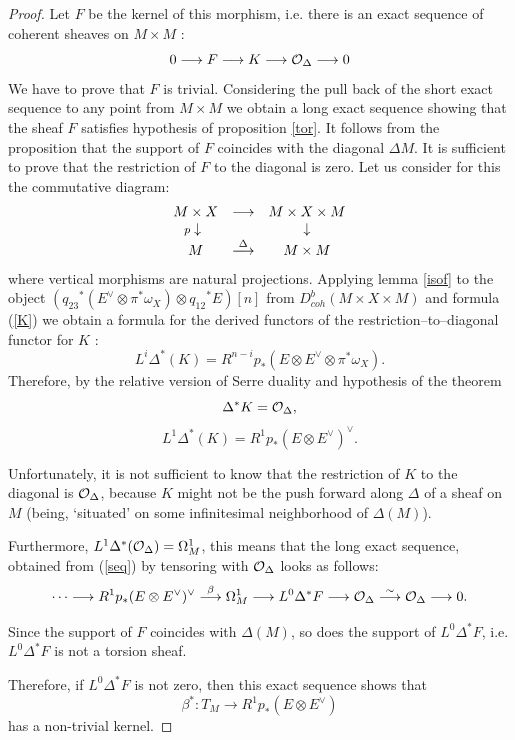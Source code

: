 \documentclass[12pt]{article}
\def\db#1{ D^b_{coh}({#1})}
\def\lto{\longrightarrow}
\def\o#1{{\cal O}_{#1}}
\begin{document}
\begin{proof}
Let $F$ be the kernel of this morphism, i.e. there is an exact sequence of coherent sheaves on $M\times M$ :
\begin{equation}\label{seq}
0\lto F \lto K\lto {\o\Delta}\lto 0
\end{equation}
We have to prove that $F$ is trivial. Considering the pull back of the short exact sequence to any point from $M\times M$ we obtain a long exact sequence showing that the sheaf $F$ satisfies hypothesis of proposition \ref{tor}. It follows from the proposition that the support of $F$ coincides with the diagonal $\Delta M$. It is sufficient to prove that the restriction of $F$ to the diagonal is zero. Let us consider for this the commutative diagram:
$$
\begin{array}{ccc}
M\times X&{\longrightarrow}& M\times X\times M\\
\llap{\footnotesize $p$} \downarrow && \downarrow\\
M&\stackrel{\Delta}{\longrightarrow}& M\times M 
\end{array}
$$
where vertical morphisms are natural projections. Applying lemma \ref{isof} to the object $({q_{23}}^*(E^{\vee}\otimes \pi^*\omega_X)\otimes {q_{12}}^*E)[n]$ from $\db{M\times X\times M}$ and formula (\ref{K}) we obtain a formula for the  derived functors of the restriction--to--diagonal functor for $K$ :
$$
L^i\Delta^*(K)=R^{n-i} p_*(E\otimes E^{\vee}\otimes \pi^*\omega_X).
$$
Therefore, by the relative version of Serre duality and hypothesis of the theorem
$$
\Delta^*K={\o \Delta},
$$
$$
L^1 \Delta^*(K)=R^1p_*(E\otimes E^{\vee})^{\vee}.
$$

Unfortunately, it is not sufficient to know that the restriction of $K$ to the diagonal is $ {\o \Delta}$, because $K$ might not be the push forward along $\Delta$ of a sheaf on $M$ (being, `situated' on some infinitesimal neighborhood of  $\Delta(M)$).
 
Furthermore, $L^1 \Delta^*({\o \Delta})=\Omega^1_M$, this means that the long exact sequence, obtained from (\ref{seq}) by tensoring with ${\o \Delta}$  looks as follows:
$$
\cdots\lto R^1p_*(E\otimes E^{\vee})^{\vee}\stackrel{\beta}{\lto} \Omega^1_M\lto L^0\Delta^* F\lto{\o \Delta}\stackrel{\sim}{\lto}{\o \Delta}\lto 0.
$$ 

Since the support of $F$ coincides with $\Delta(M)$, so does the support of $L^0\Delta^* F$, i.e. $L^0\Delta^* F$ is not a torsion sheaf.

Therefore, if $L^0\Delta^* F$ is not zero, then this exact sequence shows that
$$
\beta^* : T_M\lto R^1p_*(E\otimes E^{\vee})
$$
has a non-trivial kernel.
\par
\bigskip


\end{proof}
\end{document}
